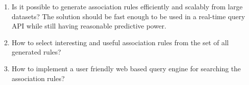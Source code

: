 \begin{enumerate}
	\item Is it possible to generate association rules efficiently and scalably from large datasets? The solution should be fast enough to be used in a real-time query API while still having reasonable predictive power. 
	
	\item How to select interesting and useful association rules from the set of all generated rules? 
	
	\item How to implement a user friendly web based query engine for searching the association rules? 
\end{enumerate}  



